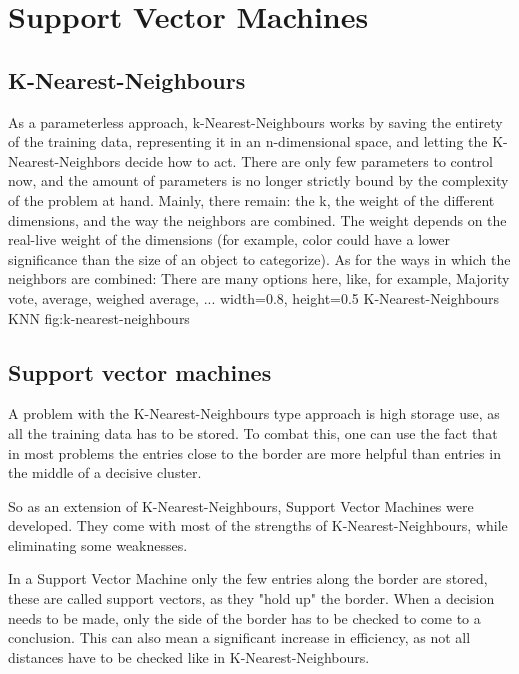 \section{Support Vector Machines}
\label{sec:SVM}
\subsection{K-Nearest-Neighbours}
\cite[p. 783]{MA}
As a parameterless approach, k-Nearest-Neighbours works by saving the entirety of the training data, representing it in an n-dimensional space, and letting the K-Nearest-Neighbors decide how to act. There are only few parameters to control now, and the amount of parameters is no longer strictly bound by the complexity of the problem at hand. Mainly, there remain: the k, the weight of the different dimensions, and the way the neighbors are combined. 
The weight depends on the real-live weight of the dimensions (for example, color could have a lower significance than the size of an object to categorize).
As for the ways in which the neighbors are combined: There are many options here, like, for example, Majority vote, average, weighed average, ...
    {width=0.8\textwidth, height=0.5\textheight} %
    {K-Nearest-Neighbours}   %
    {KNN}   %
    {fig:k-nearest-neighbours}    %

\subsection{Support vector machines}
\cite[p. 744]{MA}
A problem with the K-Nearest-Neighbours type approach is high storage use, as all the training data has to be stored. To combat this, one can use the fact that in most problems the entries close to the border are more helpful than entries in the middle of a decisive cluster.

So as an extension of K-Nearest-Neighbours, Support Vector Machines were developed. They come with most of the strengths of K-Nearest-Neighbours, while eliminating some weaknesses.

In a Support Vector Machine only the few entries along the border are stored, these are called support vectors, as they "hold up" the border. When a decision needs to be made, only the side of the border has to be checked to come to a conclusion. This can also mean a significant increase in efficiency, as not all distances have to be checked like in K-Nearest-Neighbours.

